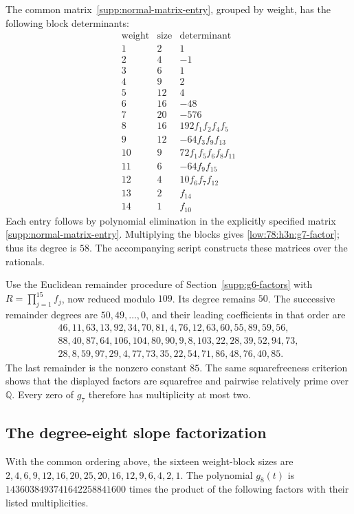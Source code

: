 \documentclass[11pt]{amsart}
\theoremstyle{definition}
\theoremstyle{remark}
\numberwithin{equation}{section}
\begin{document}
The common matrix~\eqref{supp:normal-matrix-entry}, grouped by weight, has the following block determinants:
\[
\begin{array}{c|r|l}
\text{weight}&\text{size}&\text{determinant}\\\hline
1&2&1\\2&4&-1\\3&6&1\\4&9&2\\5&12&4\\6&16&-48\\7&20&-576\\
8&16&192f_1f_2f_4f_5\\
9&12&-64f_3f_9f_{13}\\
10&9&72f_1f_5f_6f_8f_{11}\\
11&6&-64f_9f_{15}\\
12&4&10f_6f_7f_{12}\\
13&2&f_{14}\\
14&1&f_{10}
\end{array}
\]
Each entry follows by polynomial elimination in the explicitly specified matrix \eqref{supp:normal-matrix-entry}. Multiplying the blocks gives \eqref{low:78:h3n:g7-factor}; thus its degree is $58$. The accompanying script constructs these matrices over the rationals.

Use the Euclidean remainder procedure of Section~\ref{supp:g6-factors} with $R=\prod_{j=1}^{15}f_j$, now reduced modulo $109$. Its degree remains $50$. The successive remainder degrees are $50,49,\ldots,0$, and their leading coefficients in that order are
\[
\begin{gathered}
46,11,63,13,92,34,70,81,4,76,12,63,60,55,89,59,56,\\
88,40,87,64,106,104,80,90,9,8,103,22,28,39,52,94,73,\\
28,8,59,97,29,4,77,73,35,22,54,71,86,48,76,40,85.
\end{gathered}
\]
The last remainder is the nonzero constant $85$. The same squarefreeness criterion shows that the displayed factors are squarefree and pairwise relatively prime over $\mathbb Q$. Every zero of $g_7$ therefore has multiplicity at most two.
\subsection{The degree-eight slope factorization}\label{supp:g8-factors}
With the common ordering above, the sixteen weight-block sizes are $2,4,6,9,12,16,20,25,20,16,12,9,6,4,2,1$. The polynomial $g_8(t)$ is $1436038493741642258841600$ times the product of the following factors with their listed multiplicities.
\end{document}
